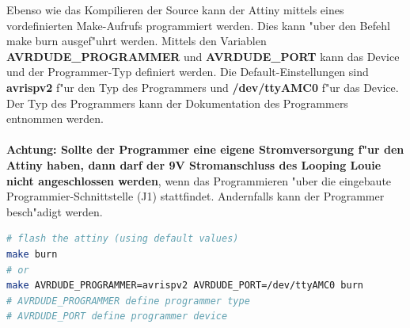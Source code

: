 Ebenso wie das Kompilieren der Source kann der Attiny mittels eines vordefinierten Make-Aufrufs programmiert werden.
Dies kann "uber den Befehl \grqq{}make burn\grqq{} ausgef"uhrt werden.
Mittels den Variablen \textbf{AVRDUDE\_PROGRAMMER} und \textbf{AVRDUDE\_PORT} kann das Device und der Programmer-Typ definiert werden.
Die Default-Einstellungen sind \textbf{avrispv2} f"ur den Typ des Programmers und \textbf{/dev/ttyAMC0} f"ur das Device.
Der Typ des Programmers kann der Dokumentation des Programmers entnommen werden. \\
\\
\textbf{Achtung: Sollte der Programmer eine eigene Stromversorgung f"ur den Attiny haben, dann darf der 9V Stromanschluss des Looping Louie nicht angeschlossen werden}, wenn das Programmieren "uber die eingebaute Programmier-Schnittstelle (J1) stattfindet. Andernfalls kann der Programmer besch"adigt werden.

\vspace{0.5cm}
\begin{lstlisting}[caption={Programming},language=sh,label=lst:makeburn]
# flash the attiny (using default values)
make burn
# or
make AVRDUDE_PROGRAMMER=avrispv2 AVRDUDE_PORT=/dev/ttyAMC0 burn
# AVRDUDE_PROGRAMMER define programmer type
# AVRDUDE_PORT define programmer device
\end{lstlisting}
\vspace{0.5cm}




